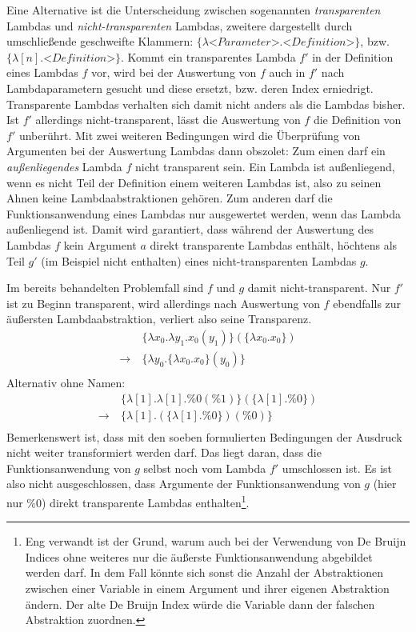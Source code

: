  Eine Alternative ist die Unterscheidung zwischen sogenannten \emph{transparenten} Lambdas und \emph{nicht-transparenten} Lambdas, zweitere dargestellt durch umschließende geschweifte Klammern: $\{\lambda \textit{<Parameter>}.\textit{<Definition>}\}$, bzw. $\{\lambda [n].\textit{<Definition>}\}$. Kommt ein transparentes Lambda $f'$ in der Definition eines Lambdas $f$ vor, wird bei der Auswertung von $f$ auch in $f'$ nach Lambdaparametern gesucht und diese ersetzt, bzw. deren Index erniedrigt. Transparente Lambdas verhalten sich damit nicht anders als die Lambdas bisher. Ist $f'$ allerdings nicht-transparent, lässt die Auswertung von $f$ die Definition von $f'$ unberührt. 
 Mit zwei weiteren Bedingungen wird die Überprüfung von Argumenten bei der Auswertung Lambdas dann obszolet: 
 Zum einen darf ein \emph{außenliegendes} Lambda $f$ nicht transparent sein. Ein Lambda ist außenliegend, wenn es nicht Teil der Definition einem weiteren Lambdas ist, also zu seinen Ahnen keine Lambdaabstraktionen gehören. Zum anderen darf die Funktionsanwendung eines Lambdas nur ausgewertet werden, wenn das Lambda außenliegend ist. Damit wird garantiert, dass während der Auswertung des Lambdas $f$ kein Argument $a$ direkt transparente Lambdas enthält, höchtens als Teil $g'$ (im Beispiel nicht enthalten) eines nicht-transparenten Lambdas $g$.

Im bereits behandelten Problemfall sind $f$ und $g$ damit nicht-transparent. Nur $f'$ ist zu Beginn transparent, wird allerdings nach Auswertung von $f$ ebendfalls zur äußersten Lambdaabstraktion, verliert also seine Transparenz. 
\begin{align*}
    ~           &~\{\lambda x_0 .\lambda y_1 .x_0(y_1)\}(\{\lambda x_0 .x_0\}) \\
    \rightarrow &~\{\lambda y_0 .\{\lambda x_0 .x_0\}(y_0)\}\\
\end{align*}
Alternativ ohne Namen:
\begin{align*}
    ~           &~\{\lambda [1] .\lambda [1] .\%0(\%1)\}(\{\lambda [1] .\%0\}) \\
    \rightarrow &~\{\lambda [1] .(\{\lambda [1] .\%0\})(\%0)\}\\
\end{align*}
Bemerkenswert ist, dass mit den soeben formulierten Bedingungen der Ausdruck nicht weiter transformiert werden darf. Das liegt daran, dass die Funktionsanwendung von $g$ selbst noch vom Lambda $f'$ umschlossen ist. Es ist also nicht ausgeschlossen, dass Argumente der Funktionsanwendung von $g$ (hier nur $\%0$) direkt transparente Lambdas enthalten\footnote{Eng verwandt ist der Grund, warum auch bei der Verwendung von De Bruijn Indices ohne weiteres nur die äußerste Funktionsanwendung abgebildet werden darf. In dem Fall könnte sich sonst die Anzahl der Abstraktionen zwischen einer Variable in einem Argument und ihrer eigenen Abstraktion ändern. Der alte De Bruijn Index würde die Variable dann der falschen Abstraktion zuordnen.}.




